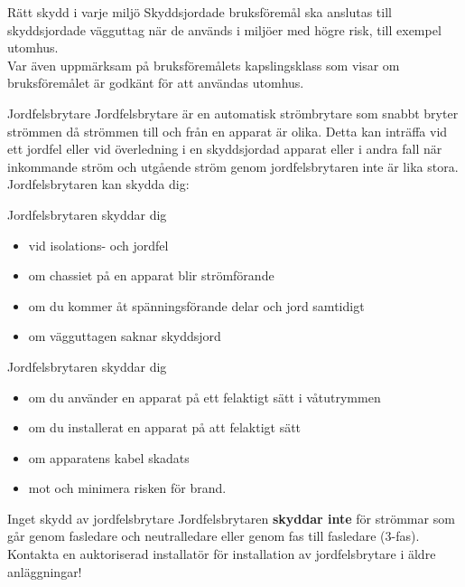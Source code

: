 \documentclass{beamer}
\begin{document}
\begin{frame}{Rätt skydd i varje miljö}
Skyddsjordade bruksföremål ska anslutas till skyddsjordade vägguttag när de
används i miljöer med högre risk, till exempel utomhus.\\
\vspace{5mm}
Var även uppmärksam på bruksföremålets kapslingsklass som visar om bruksföremålet är
godkänt för att användas utomhus.
\end{frame}

\begin{frame}{Jordfelsbrytare}
Jordfelsbrytare är en automatisk strömbrytare som snabbt bryter strömmen
då strömmen till och från en apparat är olika.
Detta kan inträffa vid ett jordfel eller vid överledning i en skyddsjordad
apparat eller i andra fall när inkommande ström och utgående ström genom
jordfelsbrytaren inte är lika stora.\\
\vspace{5mm}
Jordfelsbrytaren kan skydda dig:
\end{frame}

\begin{frame}{Jordfelsbrytaren skyddar dig}
\begin{itemize}
	\item vid isolations- och jordfel
	\item om chassiet på en apparat blir strömförande
	\item om du kommer åt spänningsförande delar och jord samtidigt
	\item om vägguttagen saknar skyddsjord
\end{itemize}
\end{frame}

\begin{frame}{Jordfelsbrytaren skyddar dig}
\begin{itemize}
	\item om du använder en apparat på ett felaktigt sätt i våtutrymmen
	\item om du installerat en apparat på att felaktigt sätt
	\item om apparatens kabel skadats
	\item mot och minimera risken för brand.
\end{itemize}
\end{frame}

\begin{frame}{Inget skydd av jordfelsbrytare}
Jordfelsbrytaren \textbf{skyddar inte} för strömmar som går genom fasledare
och neutralledare eller genom fas till fasledare (3-fas).\\
\vspace{5mm}
Kontakta en auktoriserad installatör för installation av jordfelsbrytare i äldre
anläggningar!
\end{frame}
\end{document}
